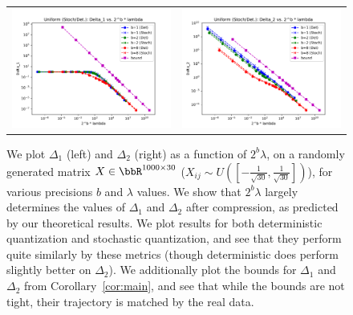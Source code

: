 \begin{figure}
	\centering
	\begin{tabular}{c c}
		\includegraphics[width=0.4\linewidth]{figures/micro_uniform_nonadapt_delta1_vs_2_b_lambda.pdf} &	
		\includegraphics[width=0.4\linewidth]{figures/micro_uniform_nonadapt_delta2_vs_2_b_lambda.pdf}
	\end{tabular}
	\caption{We plot $\Delta_1$ (left) and $\Delta_2$ (right) as a function of $2^b\lambda$, on a randomly generated matrix $X\in\RR^{1000\times 30}$ ($X_{ij}\sim U([-\frac{1}{\sqrt{30}},\frac{1}{\sqrt{30}}])$), for various precisions $b$ and $\lambda$ values.  We show that $2^b \lambda$ largely determines the values of $\Delta_1$ and $\Delta_2$ after compression, as predicted by our theoretical results. We plot results for both deterministic quantization and stochastic quantization, and see that they perform quite similarly by these metrics (though deterministic does perform slightly better on $\Delta_2$). We additionally plot the bounds for $\Delta_1$ and $\Delta_2$ from Corollary~\ref{cor:main}, and see that while the bounds are not tight, their trajectory is matched by the real data.}
	\label{fig:micro_d1d2}
\end{figure}

